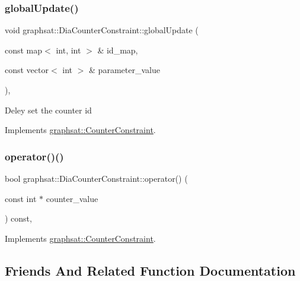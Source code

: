 \subsubsection{\texorpdfstring{globalUpdate()}{globalUpdate()}}
{\footnotesize\ttfamily void graphsat\+::\+Dia\+Counter\+Constraint\+::global\+Update (\begin{DoxyParamCaption}\item[{const map$<$ int, int $>$ \&}]{id\+\_\+map,  }\item[{const vector$<$ int $>$ \&}]{parameter\+\_\+value }\end{DoxyParamCaption})\hspace{0.3cm}{\ttfamily [inline]}, {\ttfamily [virtual]}}

Deley set the counter id 

Implements \mbox{\hyperlink{classgraphsat_1_1_counter_constraint_aa467ff66b37a1cbc69f5eddb269aaa0d}{graphsat\+::\+Counter\+Constraint}}.

\mbox{\label{classgraphsat_1_1_dia_counter_constraint_a31a8b26714bab4aca765556272dae334}} 
\subsubsection{\texorpdfstring{operator()()}{operator()()}}
{\footnotesize\ttfamily bool graphsat\+::\+Dia\+Counter\+Constraint\+::operator() (\begin{DoxyParamCaption}\item[{const int $\ast$}]{counter\+\_\+value }\end{DoxyParamCaption}) const\hspace{0.3cm}{\ttfamily [inline]}, {\ttfamily [virtual]}}



Implements \mbox{\hyperlink{classgraphsat_1_1_counter_constraint_a1fb82c50097b34656ef5ca319dd352da}{graphsat\+::\+Counter\+Constraint}}.



\subsection{Friends And Related Function Documentation}
\mbox{\label{classgraphsat_1_1_dia_counter_constraint_ad4b3c25c041701ae56dc1e78df779d2f}} 

